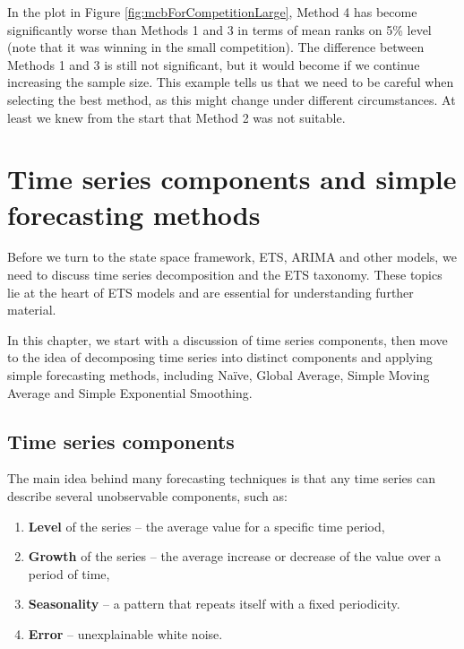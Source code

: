 \documentclass[]{book}
\providecommand{\tightlist}{%
  \setlength{\itemsep}{0pt}\setlength{\parskip}{0pt}}
\theoremstyle{definition}
\theoremstyle{definition}
\theoremstyle{definition}
\theoremstyle{definition}
\theoremstyle{remark}
\begin{document}
In the plot in Figure \ref{fig:mcbForCompetitionLarge}, Method 4 has become significantly worse than Methods 1 and 3 in terms of mean ranks on 5\% level (note that it was winning in the small competition). The difference between Methods 1 and 3 is still not significant, but it would become if we continue increasing the sample size. This example tells us that we need to be careful when selecting the best method, as this might change under different circumstances. At least we knew from the start that Method 2 was not suitable.

\hypertarget{tsDecomposition}{%
\chapter{Time series components and simple forecasting methods}\label{tsDecomposition}}

Before we turn to the state space framework, ETS, ARIMA and other models, we need to discuss time series decomposition and the ETS taxonomy. These topics lie at the heart of ETS models and are essential for understanding further material.

In this chapter, we start with a discussion of time series components, then move to the idea of decomposing time series into distinct components and applying simple forecasting methods, including Naïve, Global Average, Simple Moving Average and Simple Exponential Smoothing.

\hypertarget{tsComponents}{%
\section{Time series components}\label{tsComponents}}

The main idea behind many forecasting techniques is that any time series can describe several unobservable components, such as:

\begin{enumerate}
\def\labelenumi{\arabic{enumi}.}
\tightlist
\item
  \textbf{Level} of the series -- the average value for a specific time period,
\item
  \textbf{Growth} of the series -- the average increase or decrease of the value over a period of time,
\item
  \textbf{Seasonality} -- a pattern that repeats itself with a fixed periodicity.
\item
  \textbf{Error} -- unexplainable white noise.
\end{enumerate}
\end{document}

